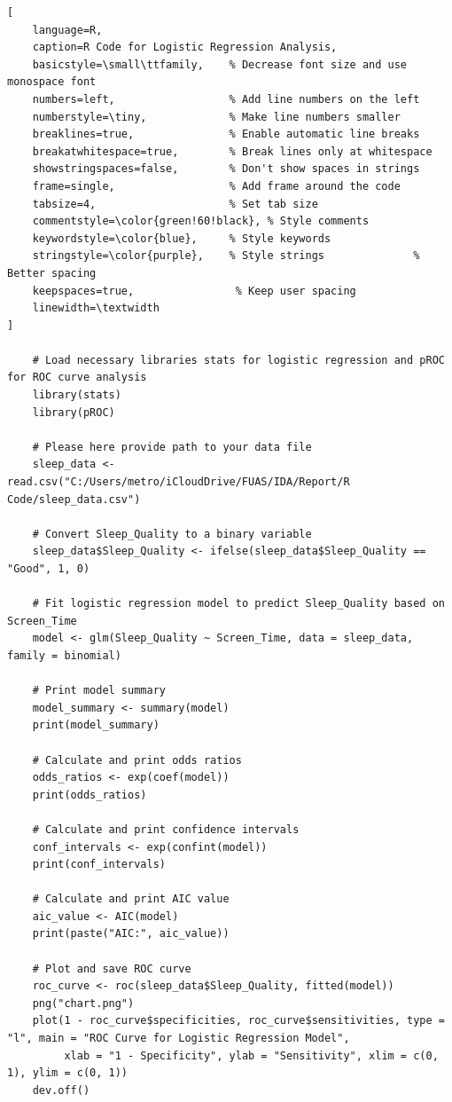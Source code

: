 \documentclass[conference]{IEEEtran}
\begin{document}
\begin{lstlisting}[
    language=R,
    caption=R Code for Logistic Regression Analysis,
    basicstyle=\small\ttfamily,    % Decrease font size and use monospace font
    numbers=left,                  % Add line numbers on the left
    numberstyle=\tiny,             % Make line numbers smaller
    breaklines=true,               % Enable automatic line breaks
    breakatwhitespace=true,        % Break lines only at whitespace
    showstringspaces=false,        % Don't show spaces in strings
    frame=single,                  % Add frame around the code
    tabsize=4,                     % Set tab size
    commentstyle=\color{green!60!black}, % Style comments
    keywordstyle=\color{blue},     % Style keywords
    stringstyle=\color{purple},    % Style strings              % Better spacing
    keepspaces=true,                % Keep user spacing
    linewidth=\textwidth
]

    # Load necessary libraries stats for logistic regression and pROC for ROC curve analysis
    library(stats)
    library(pROC)
    
    # Please here provide path to your data file
    sleep_data <- read.csv("C:/Users/metro/iCloudDrive/FUAS/IDA/Report/R Code/sleep_data.csv") 
    
    # Convert Sleep_Quality to a binary variable
    sleep_data$Sleep_Quality <- ifelse(sleep_data$Sleep_Quality == "Good", 1, 0)
    
    # Fit logistic regression model to predict Sleep_Quality based on Screen_Time
    model <- glm(Sleep_Quality ~ Screen_Time, data = sleep_data, family = binomial)
    
    # Print model summary
    model_summary <- summary(model)
    print(model_summary)
    
    # Calculate and print odds ratios
    odds_ratios <- exp(coef(model))
    print(odds_ratios)
    
    # Calculate and print confidence intervals
    conf_intervals <- exp(confint(model))
    print(conf_intervals)
    
    # Calculate and print AIC value
    aic_value <- AIC(model)
    print(paste("AIC:", aic_value))
    
    # Plot and save ROC curve
    roc_curve <- roc(sleep_data$Sleep_Quality, fitted(model))
    png("chart.png")
    plot(1 - roc_curve$specificities, roc_curve$sensitivities, type = "l", main = "ROC Curve for Logistic Regression Model",
         xlab = "1 - Specificity", ylab = "Sensitivity", xlim = c(0, 1), ylim = c(0, 1))
    dev.off()
    

\end{lstlisting}
\end{document}
